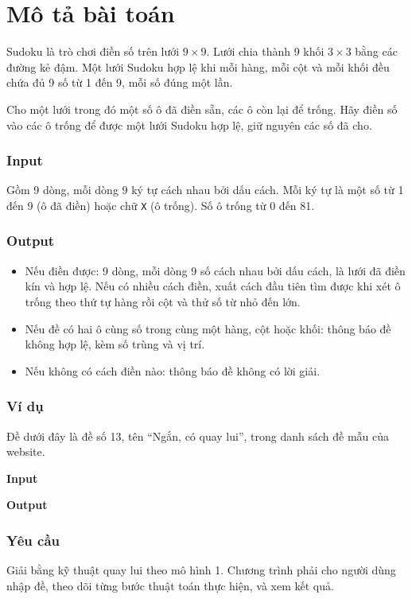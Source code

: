 \chapter{Mô tả bài toán}

Sudoku là trò chơi điền số trên lưới \(9 \times 9\). Lưới chia thành 9 khối \(3 \times 3\) bằng các đường kẻ đậm. Một lưới Sudoku hợp lệ khi mỗi hàng, mỗi cột và mỗi khối đều chứa đủ 9 số từ 1 đến 9, mỗi số đúng một lần.

Cho một lưới trong đó một số ô đã điền sẵn, các ô còn lại để trống. Hãy điền số vào các ô trống để được một lưới Sudoku hợp lệ, giữ nguyên các số đã cho.

\subsection*{Input}

Gồm 9 dòng, mỗi dòng 9 ký tự cách nhau bởi dấu cách. Mỗi ký tự là một số từ 1 đến 9 (ô đã điền) hoặc chữ \texttt{X} (ô trống). Số ô trống từ 0 đến 81.

\subsection*{Output}

\begin{itemize}
  \item Nếu điền được: 9 dòng, mỗi dòng 9 số cách nhau bởi dấu cách, là lưới đã điền kín và hợp lệ. Nếu có nhiều cách điền, xuất cách đầu tiên tìm được khi xét ô trống theo thứ tự hàng rồi cột và thử số từ nhỏ đến lớn.
  \item Nếu đề có hai ô cùng số trong cùng một hàng, cột hoặc khối: thông báo đề không hợp lệ, kèm số trùng và vị trí.
  \item Nếu không có cách điền nào: thông báo đề không có lời giải.
\end{itemize}

\subsection*{Ví dụ}

Đề dưới đây là đề số 13, tên ``Ngắn, có quay lui'', trong danh sách đề mẫu của website.

\begin{center}
  \begin{minipage}[t]{0.44\linewidth}
    \textbf{Input}
    
  \end{minipage}
  \hfill
  \begin{minipage}[t]{0.44\linewidth}
    \textbf{Output}
    
  \end{minipage}
\end{center}

\subsection*{Yêu cầu}

Giải bằng kỹ thuật quay lui theo mô hình 1. Chương trình phải cho người dùng nhập đề, theo dõi từng bước thuật toán thực hiện, và xem kết quả.

